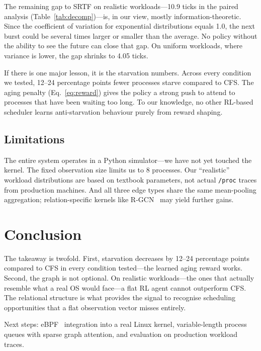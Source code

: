 \documentclass[conference]{IEEEtran}
\begin{document}
The remaining gap to SRTF on realistic workloads---10.9 ticks in the
paired analysis (Table~\ref{tab:decomp})---is, in our view, mostly
information-theoretic. Since the coefficient of variation for
exponential distributions equals 1.0, the next burst could be several times
larger or smaller than the average. No policy without the ability to see
the future can close that gap. On uniform workloads, where variance is
lower, the gap shrinks to 4.05 ticks.

If there is one major lesson, it is the starvation numbers. Across every
condition we tested, 12--24 percentage points fewer processes starve
compared to CFS. The aging penalty (Eq.~\ref{eq:reward}) gives the policy a
strong push to attend to processes that have been waiting too long. To our
knowledge, no other RL-based scheduler learns anti-starvation behaviour
purely from reward shaping.

\subsection{Limitations}

The entire system operates in a Python simulator---we have not yet touched
the kernel. The fixed observation size limits us to 8 processes. Our
``realistic'' workload distributions are based on textbook parameters, not
actual \texttt{/proc} traces from production machines. And all three edge
types share the same mean-pooling aggregation; relation-specific kernels
like R-GCN~\cite{schlichtkrull2018rgcn} may yield further gains.

\section{Conclusion}

The takeaway is twofold. First, starvation decreases by 12--24 percentage
points compared to CFS in every condition tested---the learned aging reward
works. Second, the graph is not optional. On realistic workloads---the ones
that actually resemble what a real OS would face---a flat RL agent cannot
outperform CFS. The relational structure is what provides the signal to
recognise scheduling opportunities that a flat observation vector misses
entirely.

Next steps: eBPF~\cite{ebpf2024} integration into a real Linux kernel,
variable-length process queues with sparse graph attention, and evaluation
on production workload traces.



\end{document}
